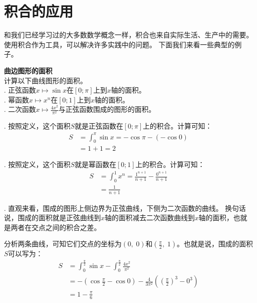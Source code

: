 \documentclass[12pt,UTF8,fontset=none]{ctexbook}
\begin{document}
\section{积合的应用}

和我们已经学习过的大多数数学概念一样，积合也来自实际生活、生产中的需要。使用积合作为工具，可以解决许多实践中的问题。
下面我们来看一些典型的例子。

\begin{et}{\textbf{曲边图形的面积}}\\
    计算以下曲线图形的面积。\\
    . 正弦函数$x\mapsto \sin{x}$在$[0;\pi]$上到$x$轴的面积。 \\
    . 幂函数$x\mapsto x^n$在$[0;1]$上到$x$轴的面积。\\
    . 二次函数$x \mapsto \frac{4x^2}{\pi^2}$与正弦函数围成的图形的面积。
\end{et}

\begin{so}
    . 按照定义，这个面积$S$就是正弦函数在$[0;\pi]$上的积合。计算可知：
    \begin{align*}
        S &= \int_{0}^{\pi} \sin{x} = -\cos{\pi} - (-\cos{0}) \\
        &= 1 + 1 = 2
    \end{align*}

    . 按照定义，这个面积$S$就是幂函数在$[0;1]$上的积合。计算可知：
    \begin{align*}
        S &= \int_{0}^{1} x^n = \frac{1^{n+1}}{n+1}- \frac{0^{n+1}}{n+1} \\
        &= \frac{1}{n+1}
    \end{align*}

    . 直观来看，围成的图形上侧边界为正弦曲线，下侧为二次函数的曲线。
    换句话说，围成的面积就是正弦曲线到$x$轴的面积减去二次函数曲线到$x$轴的面积，也就是两者在交点之间的积合之差。

    \indent 分析两条曲线，可知它们交点的坐标为$(0,\;0)$和$\left(\frac{\pi}{2},\;1\right)$。也就是说，围成的面积$S$可以写为：
    \begin{align*}
        S &= \int_{0}^{\frac{\pi}{2}} \sin{x} - \int_{0}^{\frac{\pi}{2}} \frac{4x^2}{\pi^2} \\ 
        &= -\left(\cos{\frac{\pi}{2}} - \cos{0}\right) - \frac{4}{3\pi^2} \left( \left( \frac{\pi}{2} \right)^3 - 0^3 \right) \\
        &= 1 - \frac{\pi}{6}
    \end{align*}
\end{so}
\end{document}
